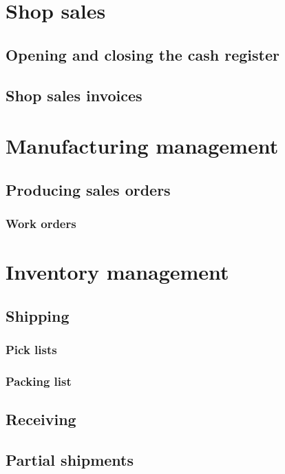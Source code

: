 \chapter{Shop sales}

\section{Opening and closing the cash register}

\section{Shop sales invoices}


\chapter{Manufacturing management}

\section{Producing sales orders}

\subsection{Work orders}


\chapter{Inventory management}

\section{Shipping}

\subsection{Pick lists}
\subsection{Packing list}

\section{Receiving}

\section{Partial shipments}

